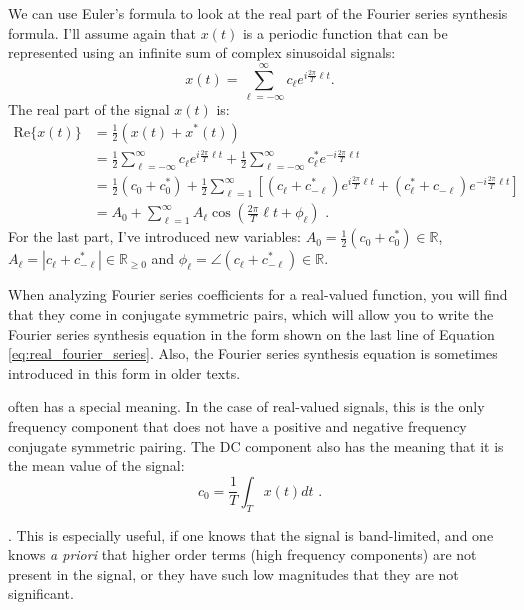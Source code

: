  We can use Euler's formula to look at the real part of the Fourier series synthesis formula. I'll assume again that $x(t)$ is a periodic function that can be represented using an infinite sum of complex sinusoidal signals:
\begin{equation}
x(t) = \sum_{\ell = -\infty}^{\infty} c_{\ell} e^{i\frac{2\pi}{T}\ell t}.
\end{equation}
The real part of the signal $x(t)$ is:
\begin{align}
\mathrm{Re}\{x(t)\} &= \frac{1}{2} (x(t) + x^*(t)) \\
&= \frac{1}{2}\sum_{\ell=-\infty}^{\infty} c_{\ell} e^{i\frac{2\pi}{T}\ell t} + \frac{1}{2}\sum_{\ell=-\infty}^{\infty} c^*_{\ell} e^{-i\frac{2\pi}{T}\ell t} \\
&= \frac{1}{2}(c_0 + c_0^*) + \frac{1}{2}\sum_{\ell=1}^{\infty}[ (c_{\ell} + c^*_{-\ell}) e^{i\frac{2\pi}{T}\ell t} + (c^*_{\ell} + c_{-\ell}) e^{-i\frac{2\pi}{T}\ell t}]\\
&= A_0 + \sum_{\ell=1}^{\infty} A_\ell \cos\left(\frac{2\pi}{T}\ell t+\phi_\ell\right) \,\,.
\label{eq:real_fourier_series}
\end{align}
For the last part, I've introduced new variables: $A_0= \frac{1}{2}(c_0 + c_0^*) \in \mathbb{R}$, $A_\ell = |c_{\ell} +c^*_{-\ell}|\in \mathbb{R}_{\ge 0}$ and $\phi_\ell = \angle (c_{\ell} + c^*_{-\ell}) \in \mathbb{R}$. 

When analyzing Fourier series coefficients for a real-valued function, you will find that they come in conjugate symmetric pairs, 
which will allow you to write the Fourier series synthesis equation in the form shown on the last line of Equation \ref{eq:real_fourier_series}. 
Also, the Fourier series synthesis equation is sometimes introduced in this form in older texts.

 often has a special meaning. In the case of real-valued signals, 
this is the only frequency component that does not have a positive and negative frequency conjugate symmetric pairing. The DC component also has the meaning that it is the mean value of the signal:
\begin{equation}
c_0 = \frac{1}{T} \int_{T} x(t) dt \,\,.
\end{equation}

. This is especially useful, if one knows that the signal is band-limited, 
and one knows \emph{a priori} that higher order terms (high frequency components) are not present in the signal, or they have such low magnitudes that they are not significant. 


